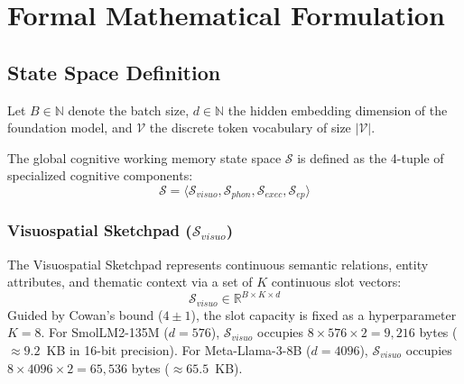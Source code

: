 \documentclass[11pt,a4paper]{article}
\begin{document}
\section{Formal Mathematical Formulation}

\subsection{State Space Definition}
Let $B \in \mathbb{N}$ denote the batch size, $d \in \mathbb{N}$ the hidden embedding dimension of the foundation model, and $\mathcal{V}$ the discrete token vocabulary of size $|\mathcal{V}|$. 

The global cognitive working memory state space $\mathcal{S}$ is defined as the 4-tuple of specialized cognitive components:
\begin{equation}
\mathcal{S} = \langle \mathcal{S}_{visuo}, \mathcal{S}_{phon}, \mathcal{S}_{exec}, \mathcal{S}_{ep} \rangle
\end{equation}

\subsubsection{Visuospatial Sketchpad ($\mathcal{S}_{visuo}$)}
The Visuospatial Sketchpad represents continuous semantic relations, entity attributes, and thematic context via a set of $K$ continuous slot vectors:
\begin{equation}
\mathcal{S}_{visuo} \in \mathbb{R}^{B \times K \times d}
\end{equation}
Guided by Cowan's bound ($4 \pm 1$), the slot capacity is fixed as a hyperparameter $K = 8$. For SmolLM2-135M ($d=576$), $\mathcal{S}_{visuo}$ occupies $8 \times 576 \times 2 = 9,216$ bytes ($\approx 9.2$~KB in 16-bit precision). For Meta-Llama-3-8B ($d=4096$), $\mathcal{S}_{visuo}$ occupies $8 \times 4096 \times 2 = 65,536$ bytes ($\approx 65.5$~KB).
\end{document}
